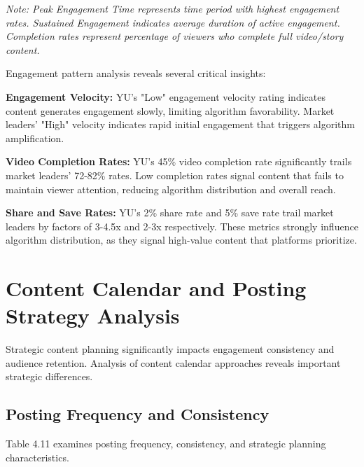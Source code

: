 \documentclass[12pt]{report}
\begin{document}
\textit{Note: Peak Engagement Time represents time period with highest engagement rates. Sustained Engagement indicates average duration of active engagement. Completion rates represent percentage of viewers who complete full video/story content.}

Engagement pattern analysis reveals several critical insights:

\textbf{Engagement Velocity:} YU's "Low" engagement velocity rating indicates content generates engagement slowly, limiting algorithm favorability. Market leaders' "High" velocity indicates rapid initial engagement that triggers algorithm amplification.

\textbf{Video Completion Rates:} YU's 45\% video completion rate significantly trails market leaders' 72-82\% rates. Low completion rates signal content that fails to maintain viewer attention, reducing algorithm distribution and overall reach.

\textbf{Share and Save Rates:} YU's 2\% share rate and 5\% save rate trail market leaders by factors of 3-4.5x and 2-3x respectively. These metrics strongly influence algorithm distribution, as they signal high-value content that platforms prioritize.

\chapter{Content Calendar and Posting Strategy Analysis}

Strategic content planning significantly impacts engagement consistency and audience retention. Analysis of content calendar approaches reveals important strategic differences.

\section{Posting Frequency and Consistency}

Table 4.11 examines posting frequency, consistency, and strategic planning characteristics.
\end{document}
